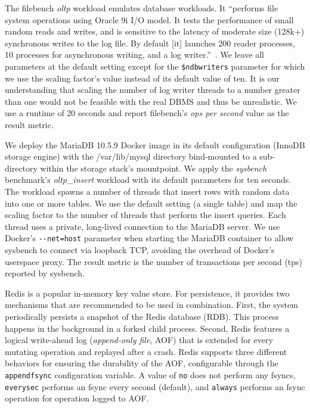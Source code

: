 \documentclass[12pt,a4paper,twoside]{book}
\begin{document}
{\begin{description}[noitemsep,leftmargin=1.5cm,labelindent=1cm]
    \item[filebench oltp] The filebench \textit{oltp} workload emulates database workloads.
        It ``performs file system operations using Oracle 9i I/O model.
        It tests the performance of small random reads and writes, and is sensitive to the latency of moderate size (128k+) synchronous writes to the log file.
        By default [it] launches 200 reader processes, 10 processes for asynchronous writing, and a log writer.''~\cite{FilebenchGitHubWiki}.
        We leave all parameters at the default setting except for the \lstinline{$ndbwriters} parameter for which we use the scaling factor's value instead of its default value of ten.
        It is our understanding that scaling the number of log writer threads to a number greater than one would not be feasible with the real DBMS and thus be unrealistic.
        We use a runtime of 20 seconds and report filebench's \textit{ops per second} value as the result metric.

    \item[MariaDB/sysbench] We deploy the MariaDB 10.5.9 Docker image in its default configuration (InnoDB storage engine) with the /var/lib/mysql directory bind-mounted to a sub-directory within the storage stack's mountpoint.
        We apply the \textit{sysbench} benchmark's \textit{oltp\_insert} workload with its default parameters for ten seconds.
        The workload spawns a number of threads that insert rows with random data into one or more tables.
        We use the default setting (a single table) and map the scaling factor to the number of threads that perform the insert queries.
        Each thread uses a private, long-lived connection to the MariaDB server.
        We use Docker's \lstinline{--net=host} parameter when starting the MariaDB container to allow sysbench to connect via loopback TCP, avoiding the overhead of Docker's userspace proxy.
        The result metric is the number of transactions per second (tps) reported by sysbench.

    \item[Redis-SET] Redis is a popular in-memory key value store.
        For persistence, it provides two mechanisms that are recommended to be used in combination.
        First, the system periodically persists a snapshot of the Redis database (RDB).
        This process happens in the background in a forked child process.
        Second, Redis features a logical write-ahead log (\textit{append-only file}, AOF) that is extended for every mutating operation and replayed after a crash.
        Redis supports three different behaviors for ensuring the durability of the AOF, configurable through the \lstinline{appendfsync} configuration variable.
        A value of \lstinline{no} does not perform any fsyncs, \lstinline{everysec} performs an fsync every second (default), and \lstinline{always} performs an fsync operation for operation logged to AOF.
        \cite{RedisPersistenceRedis}


\end{description}}
\end{document}
